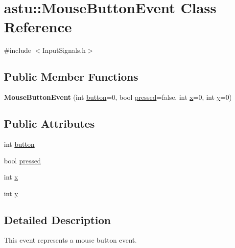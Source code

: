 \hypertarget{classastu_1_1MouseButtonEvent}{}\section{astu\+:\+:Mouse\+Button\+Event Class Reference}
\label{classastu_1_1MouseButtonEvent}


{\ttfamily \#include $<$Input\+Signals.\+h$>$}

\subsection*{Public Member Functions}
\begin{DoxyCompactItemize}
\item 
\mbox{\label{classastu_1_1MouseButtonEvent_ae20fcdba87b8c8df8d03eed6cca14629}} 
{\bfseries Mouse\+Button\+Event} (int \hyperlink{classastu_1_1MouseButtonEvent_a8dfd189ee91334495030426431158d53}{button}=0, bool \hyperlink{classastu_1_1MouseButtonEvent_ac6af684a515975ad06203d562acf0dcc}{pressed}=false, int \hyperlink{classastu_1_1MouseButtonEvent_ad4376cb6d3e59773c498d91b99c26997}{x}=0, int \hyperlink{classastu_1_1MouseButtonEvent_a44da3e7038299b1f7b651704a04634f8}{y}=0)
\end{DoxyCompactItemize}
\subsection*{Public Attributes}
\begin{DoxyCompactItemize}
\item 
int \hyperlink{classastu_1_1MouseButtonEvent_a8dfd189ee91334495030426431158d53}{button}
\item 
bool \hyperlink{classastu_1_1MouseButtonEvent_ac6af684a515975ad06203d562acf0dcc}{pressed}
\item 
int \hyperlink{classastu_1_1MouseButtonEvent_ad4376cb6d3e59773c498d91b99c26997}{x}
\item 
int \hyperlink{classastu_1_1MouseButtonEvent_a44da3e7038299b1f7b651704a04634f8}{y}
\end{DoxyCompactItemize}


\subsection{Detailed Description}
This event represents a mouse button event.

